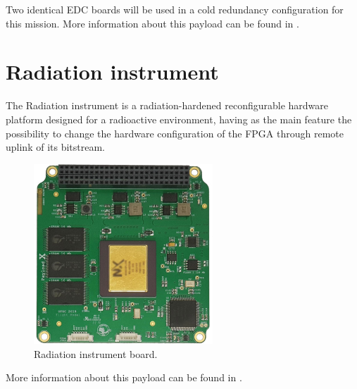 Two identical EDC boards will be used in a cold redundancy configuration for this mission. More information about this payload can be found in \cite{edc}.

\section{Radiation instrument}

The Radiation instrument is a radiation-hardened reconfigurable hardware platform designed for a radioactive environment, having as the main feature the possibility to change the hardware configuration of the FPGA through remote uplink of its bitstream.

\begin{figure}[!ht]
    \begin{center}
        \includegraphics[width=0.6\textwidth]{figures/payload-x-board}
        \caption{Radiation instrument board.}
        \label{fig:payload-x-board}
    \end{center}
\end{figure}

More information about this payload can be found in \cite{rigo2019}.



